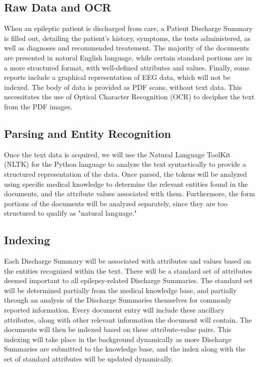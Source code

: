 \documentclass[12pt]{article}
\begin{document}
\subsection{Raw Data and OCR}
When an epileptic patient is discharged from care, a Patient Discharge Summary is
filled out, detailing the patient's history, symptoms, the tests administered, as
well as diagnoses and recommended treatement. The majority of the documents are
presented in natural English language, while certain standard portions are in a
more structured format, with well-defined attributes and values. Finally, some
reports include a graphical representation of EEG data, which will not be indexed.
The body of data is provided as PDF scans, without text data. This necessitates the use
of Optical Character Recognition (OCR) to decipher the text from the PDF images.

\subsection{Parsing and Entity Recognition}
Once the text data is acquired, we will use the Natural Language ToolKit (NLTK)
for the Python language to analyze the text syntactically to provide a structured
representation of the data. Once parsed, the tokens will be analyzed using specific
medical knowledge to determine the relevant entities found in the documents, and the
attribute values associated with them. Furthermore, the form portions of the documents
will be analyzed separately, since they are too structured to qualify as "natural
language."

\subsection{Indexing}
Each Discharge Summary will be associated with attributes and values based on the
entities recognized within the text. There will be a standard set of attributes
deemed important to all epilepsy-related Discharge Summaries. The standard set will
be determined partially from the medical knowledge base, and partially through an
analysis of the Discharge Summaries themselves for commonly reported information.
Every document entry will include these ancillary attributes, along with other
relevant information the document will contain. The documents will then be indexed
based on these attribute-value pairs. This indexing will take place in the background
dynamically as more Discharge Summaries are submitted to the knowledge base, and
the index along with the set of standard attributes will be updated dynamically.
\end{document}
